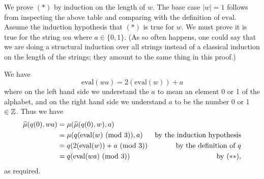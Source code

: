 \documentclass[10pt,a4paper,reqno]{amsart}
\begin{document}
We prove $(*)$ by induction on the length of $w$. The base case $|w| = 1$
follows from inspecting the above table and comparing with the definition of
$\mathrm{eval}$. Assume the induction hypothesis that $(*)$ is true for $w$. We
must prove it is true for the string $wa$ where $a \in \{0,1\}$. (As so often
happens, one could say that we are doing a structural induction over all
strings instead of a classical induction on the length of the strings; they
amount to the same thing in this proof.)

We have \[\mathrm{eval}(wa) = 2(\mathrm{eval}(w)) + a \tag{$**$}\] where on the
left hand side we understand the $a$ to mean an element 0 or 1 of the alphabet,
and on the right hand side we understand $a$ to be the number 0 or 1 $\in \mathbb{Z}$.
Thus we have
\begin{align*}
\widehat{\mu}(q(0),wa) & = \mu(\widehat{\mu}(q(0),w),a) \\
& = \mu(q(\mathrm{eval}(w)\text{ } (\mathrm{mod}\text{ } 3)),a) & \text{by the induction hypothesis}\\
& = q(2(\mathrm{eval}(w)) + a \text{ } (\mathrm{mod}\text{ } 3))& \text{by the definition of } q\\
& = q(\mathrm{eval}(wa) \text{ } (\mathrm{mod}\text{ } 3)) & \text{by } (**),
\end{align*}
as required.
\end{document}
